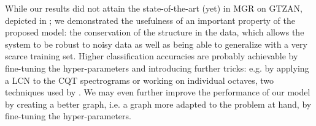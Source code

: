 While our results did not attain the state-of-the-art (yet) in \gls{MGR} on GTZAN, depicted in ;
we demonstrated the usefulness of an important property of the proposed model: the conservation of the structure in the data, which allows the system to be robust to noisy data as well as being able to generalize with a very scarce training set.
Higher classification accuracies are probably achievable by fine-tuning the hyper-parameters and introducing further tricks: e.g. by applying a \gls{LCN} to the \gls{CQT} spectrograms or working on individual octaves, two techniques used by \cite{lecun2011PSDaudio}. We may even further improve the performance of our model by creating a better graph, i.e. a graph more adapted to the problem at hand, by fine-tuning the hyper-parameters.